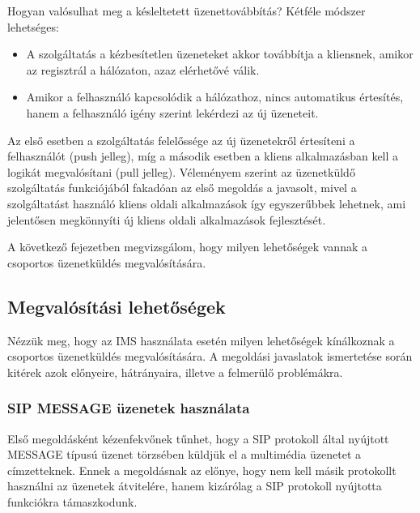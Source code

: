 Hogyan valósulhat meg a késleltetett üzenettovábbítás? Kétféle módszer lehetséges:

\begin{itemize}\itemsep1pt
\item	A szolgáltatás a kézbesítetlen üzeneteket akkor továbbítja a kliensnek, amikor az regisztrál a hálózaton, azaz elérhetővé válik.
\item Amikor a felhasználó kapcsolódik a hálózathoz, nincs automatikus értesítés, hanem a felhasználó igény szerint lekérdezi az új üzeneteit.
\end{itemize} 

Az első esetben a szolgáltatás felelőssége az új üzenetekről értesíteni a felhasználót (push jelleg), míg a második esetben a kliens alkalmazásban kell a logikát megvalósítani (pull jelleg). Véleményem szerint az üzenetküldő szolgáltatás funkciójából fakadóan az első megoldás a javasolt, mivel a szolgáltatást használó kliens oldali alkalmazások így egyszerűbbek lehetnek, ami jelentősen megkönnyíti új kliens oldali alkalmazások fejlesztését.

A következő fejezetben megvizsgálom, hogy milyen lehetőségek vannak a csoportos üzenetküldés megvalósítására.

\subsection{Megvalósítási lehetőségek}

Nézzük meg, hogy az IMS használata esetén milyen lehetőségek kínálkoznak a csoportos üzenetküldés megvalósítására. A megoldási javaslatok ismertetése során kitérek azok előnyeire, hátrányaira, illetve a felmerülő problémákra.

\subsubsection{SIP MESSAGE üzenetek használata}
\label{sec:sip_message}

Első megoldásként kézenfekvőnek tűnhet, hogy a SIP protokoll által nyújtott MESSAGE típusú üzenet törzsében küldjük el a multimédia üzenetet a címzetteknek. Ennek a megoldásnak az előnye, hogy nem kell másik protokollt használni az üzenetek átvitelére, hanem kizárólag a SIP protokoll nyújtotta funkciókra támaszkodunk. 


